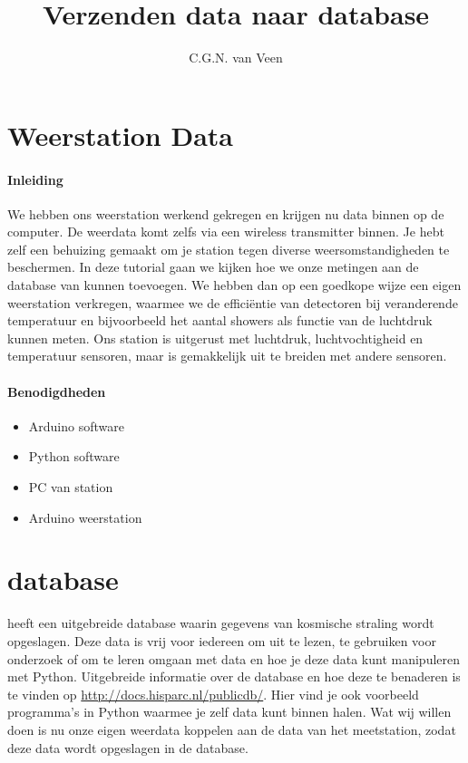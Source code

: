 

\title{Verzenden data naar \hisparc database}
\author{C.G.N. van Veen}



\maketitle

\section{Weerstation Data}

\paragraph{Inleiding} We hebben ons weerstation werkend gekregen en krijgen nu 
data binnen op de computer. De weerdata komt zelfs via een wireless
transmitter binnen. Je hebt zelf een behuizing gemaakt om je station
tegen diverse weersomstandigheden te beschermen. In deze tutorial gaan we kijken
hoe we onze metingen aan de database van \hisparc kunnen toevoegen. 
We hebben dan op een goedkope wijze een eigen weerstation verkregen, waarmee
we de efficiëntie van detectoren bij veranderende temperatuur en bijvoorbeeld 
het aantal showers als functie van de luchtdruk kunnen meten. Ons station is uitgerust 
met luchtdruk, luchtvochtigheid en temperatuur sensoren, maar is gemakkelijk uit 
te breiden met andere sensoren. 

\paragraph{Benodigdheden}

\begin{itemize}  
    \item Arduino software
    \item Python software
    \item PC van \hisparc station
    \item Arduino weerstation
    
\end{itemize}

\section{\hisparc database}

\hisparc heeft een uitgebreide database waarin gegevens van kosmische straling
wordt opgeslagen. Deze data is vrij voor iedereen om uit te lezen, te gebruiken
voor onderzoek of om te leren omgaan met data en hoe je deze data kunt manipuleren met Python.
Uitgebreide informatie over de \hisparc database en hoe deze te benaderen is te 
vinden op \url{http://docs.hisparc.nl/publicdb/}. Hier vind je ook voorbeeld
programma's in Python waarmee je zelf data kunt binnen halen.
Wat wij willen doen is nu onze eigen weerdata koppelen aan de data van het \hisparc 
meetstation, zodat deze data wordt opgeslagen in de \hisparc database.


